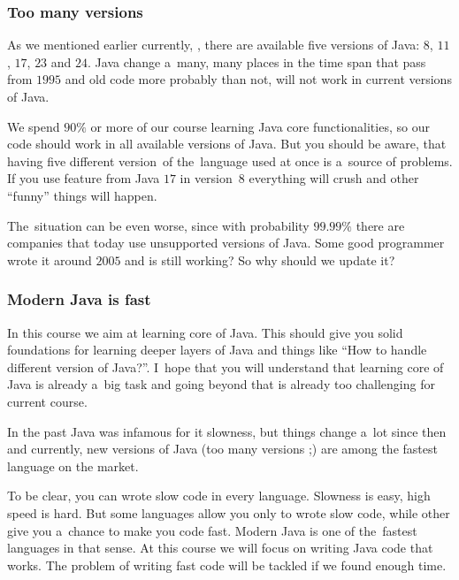 \documentclass[10pt,t]{beamer}
\begin{document}
\begin{frame}
  \frametitle{Too many versions}


  As we mentioned earlier currently, \currentYear, there are available
  \alert{five} versions of Java: $8$, $11$, $17$, $23$ and $24$. Java
  change a~many, many places in the time span that pass from $1995$ and old
  code more probably than not, will not work in current versions of Java.

  We spend $90\text{\%}$ or more of our course learning Java core
  functionalities, so our code should work in all available versions of
  Java. But you should be aware, that having \alert{five} different
  version~of the~language used at once is a~source of problems. If you use
  feature from Java $17$ in version~$8$ everything will crush and other
  ``funny'' things will happen.

  The~situation can be even worse, since with probability $99.99\text{\%}$
  there are companies that today use unsupported versions of Java. Some
  good programmer wrote it around $2005$ and is still working? So why
  should we update it?

\end{frame}





\begin{frame}
  \frametitle{Modern Java is fast}


  In this course we aim at learning core of Java. This should give you
  solid foundations for learning deeper layers of Java and things like
  ``How to handle different version of Java?''. I~hope that you will
  understand that learning core of Java is already a~big task and going
  beyond that is already too challenging for current course.

  In the past Java was infamous for it slowness, but things change a~lot
  since then and currently, new versions of Java (too many versions ;) are
  among the fastest language on the market.

  To be clear, you can wrote slow code in \alert{every} language. Slowness
  is easy, high speed is hard. But some languages allow you \alert{only}
  to wrote slow code, while other give you a~chance to make you code
  fast. Modern Java is one of the~fastest languages in that sense.
  At this course we will focus on writing Java code that works. The problem
  of writing fast code will be tackled if we found enough time.

\end{frame}
\end{document}
